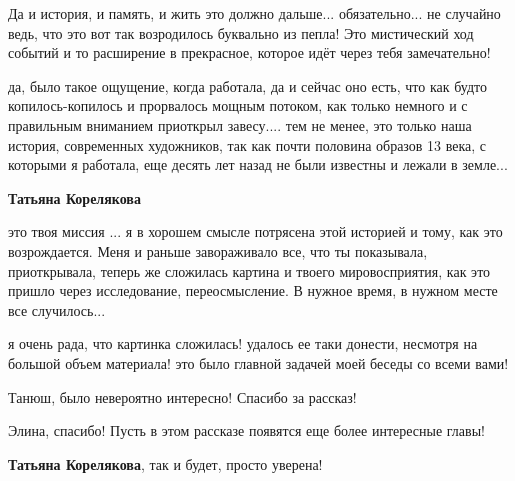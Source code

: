 \begin{itemize}
\begin{itemize}
Да и история, и память, и жить это должно дальше... обязательно... не случайно
ведь, что это вот так возродилось буквально из пепла! Это мистический ход
событий и то расширение в прекрасное, которое идёт через тебя замечательно!


да, было такое ощущение, когда работала, да и сейчас оно есть, что как будто
копилось-копилось и прорвалось мощным потоком, как только немного и с
правильным вниманием приоткрыл завесу.... тем не менее, это только наша история,
современных художников, так как почти половина образов 13 века, с которыми я
работала, еще десять лет назад не были известны и лежали в земле...

\textbf{Татьяна Корелякова} 

это твоя миссия ... я в хорошем смысле потрясена этой историей и тому, как это
возрождается. Меня и раньше завораживало все, что ты показывала,
приоткрывала, теперь же сложилась картина и твоего мировосприятия, как это
пришло через исследование, переосмысление. В нужное время, в нужном месте все
случилось...


я очень рада, что картинка сложилась! удалось ее таки донести, несмотря на
большой объем материала! это было главной задачей моей беседы со всеми вами!

\end{itemize} %

Танюш, было невероятно интересно! Спасибо за рассказ!

Элина, спасибо! Пусть в этом рассказе появятся еще более интересные главы!

\textbf{Татьяна Корелякова}, так и будет, просто уверена!

\end{itemize} %
